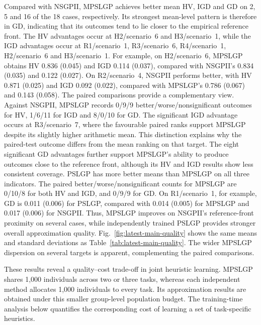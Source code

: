 \documentclass[10pt,journal]{IEEEtran}
\begin{document}
Compared with NSGPII, MPSLGP achieves better mean HV, IGD and GD on 2, 5 and 16 of the 18 cases, respectively. Its strongest mean-level pattern is therefore in GD, indicating that its outcomes tend to lie closer to the empirical reference front. The HV advantages occur at H2/scenario~6 and H3/scenario~1, while the IGD advantages occur at R1/scenario~1, R3/scenario~6, R4/scenario~1, H2/scenario~6 and H3/scenario~1. For example, on H2/scenario~6, MPSLGP obtains HV 0.836 (0.045) and IGD 0.114 (0.037), compared with NSGPII's 0.834 (0.035) and 0.122 (0.027). On R2/scenario~4, NSGPII performs better, with HV 0.871 (0.025) and IGD 0.092 (0.022), compared with MPSLGP's 0.786 (0.067) and 0.143 (0.058). The paired comparisons provide a complementary view. Against NSGPII, MPSLGP records 0/9/9 better/worse/nonsignificant outcomes for HV, 1/6/11 for IGD and 8/0/10 for GD. The significant IGD advantage occurs at R3/scenario~7, where the favourable paired ranks support MPSLGP despite its slightly higher arithmetic mean. This distinction explains why the paired-test outcome differs from the mean ranking on that target. The eight significant GD advantages further support MPSLGP's ability to produce outcomes close to the reference front, although its HV and IGD results show less consistent coverage. PSLGP has more better means than MPSLGP on all three indicators. The paired better/worse/nonsignificant counts for MPSLGP are 0/10/8 for both HV and IGD, and 0/9/9 for GD. On R1/scenario~1, for example, GD is 0.011 (0.006) for PSLGP, compared with 0.014 (0.005) for MPSLGP and 0.017 (0.006) for NSGPII. Thus, MPSLGP improves on NSGPII's reference-front proximity on several cases, while independently trained PSLGP provides stronger overall approximation quality. Fig.~\ref{fig:latest-main-quality} shows the same means and standard deviations as Table~\ref{tab:latest-main-quality}. The wider MPSLGP dispersion on several targets is apparent, complementing the paired comparisons.

These results reveal a quality--cost trade-off in joint heuristic learning. MPSLGP shares 1,000 individuals across two or three tasks, whereas each independent method allocates 1,000 individuals to every task. Its approximation results are obtained under this smaller group-level population budget. The training-time analysis below quantifies the corresponding cost of learning a set of task-specific heuristics.
\end{document}
